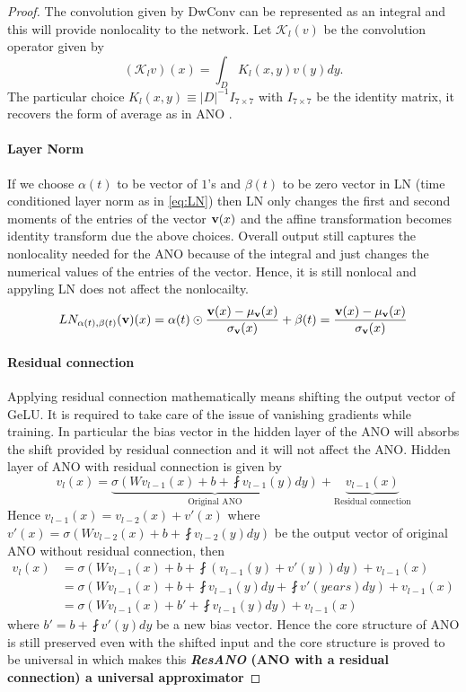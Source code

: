 \documentclass[reqno,10pt]{amsart}
\theoremstyle{plain}
\theoremstyle{definition}
\newcommand{\cal}[1]{\mathcal{#1}}
\begin{document}
\begin{proof}
    The convolution given by DwConv can be represented as an integral and this will provide nonlocality to the network. Let $\cal K_l(v)$ be the convolution operator given by
    $$(\cal K_lv)(x) = \int_{D} K_l(x,y) v(y) dy.$$
    The particular choice $K_l(x,y) \equiv |D|^{-1} I_{7\times 7}$ with $I_{7\times 7}$ be the identity matrix, it recovers the form of average as in ANO \cite{SL2024}. 
    \paragraph{\bf Layer Norm}\label{par:LN} If we choose $\alpha(t)$ to be vector of $1$'s and $\beta(t)$ to be zero vector in LN (time conditioned layer norm as in \ref{eq:LN}) then LN only changes the first and second moments of the entries of the vector ${\bf v}(x)$ and the affine transformation becomes identity transform due the above choices. Overall output still captures the nonlocality needed for the ANO because of the integral and just changes the numerical values of the entries of the vector. Hence, it is still nonlocal and appyling LN does not affect the nonlocailty.
    $$ LN_{\alpha(t),\beta(t)}({\bf v})(x) = \alpha(t) \odot \frac{{\bf v}(x) - \mu_{{\bf v}}(x)}{\sigma_{\bf v}(x)} + \beta(t) = \frac{{\bf v}(x) - \mu_{{\bf v}}(x)}{\sigma_{\bf v}(x)} $$
    \paragraph{\bf Residual connection} \label{par:resano} Applying residual connection mathematically means shifting the output vector of GeLU. It is required to take care of the issue of vanishing gradients while training. In particular the bias vector in the hidden layer of the ANO will absorbs the shift provided by residual connection and it will not affect the ANO. Hidden layer of ANO with residual connection is given by
    $$ v_l(x) = \underbrace{\sigma\left(Wv_{l-1}(x) + b + \fint v_{l-1}(y)dy\right)}_{\text{Original ANO}} + \underbrace{v_{l-1}(x)}_{\text{Residual connection}} $$
    Hence $v_{l-1}(x) = v_{l-2}(x) + v'(x)$ where $v'(x) = \sigma\left(Wv_{l-2}(x) + b + \fint v_{l-2}(y)dy\right) $ be the output vector of original ANO without residual connection, then
    \begin{equation*}
        \begin{aligned}
            v_l(x) &= \sigma\left(Wv_{l-1}(x) + b + \fint (v_{l-1}(y) + v'(y))dy\right) + v_{l-1}(x) \\
            &= \sigma\left(Wv_{l-1}(x) + b + \fint v_{l-1}(y) dy + \fint v'(years) dy\right) + v_{l-1}(x) \\
            &= \sigma\left(Wv_{l-1}(x) + b' + \fint v_{l-1}(y) dy \right) + v_{l-1}(x)
        \end{aligned}
    \end{equation*}
    where $b' = b + \fint v'(y)dy$ be a new bias vector. Hence the core structure of ANO is still preserved even with the shifted input and the core structure is proved to be universal in \cite{SL2024} which makes this {\bf {\it ResANO} (ANO with a residual connection) a universal approximator}


\end{proof}
\end{document}
